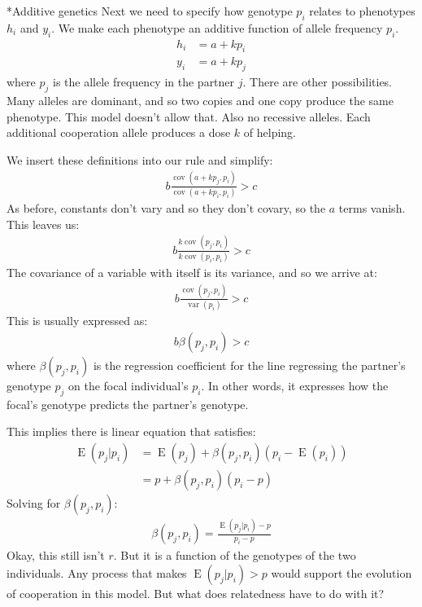 \documentclass[10pt,reqno]{amsbook}
\makeatletter
\DeclareMathOperator{\var}{var}
\DeclareMathOperator{\cov}{cov}
\DeclareMathOperator{\E}{E}
\renewcommand\subsection{\@startsection{subsection}{2}
\z@{.5\linespacing\@plus.7\linespacing}{-.5em}%
{\normalfont\normalsize\bfseries}}
\numberwithin{equation}{chapter}
\makeatother
\begin{document}
\subsection*{Additive genetics}
Next we need to specify how genotype $p_i$ relates to phenotypes $h_i$ and $y_i$. We make each phenotype an additive function of allele frequency $p_i$.
\begin{align*}
	h_i &= a + kp_i\\
	y_i &= a + kp_j
\end{align*}
where $p_j$ is the allele frequency in the partner $j$. There are other possibilities. Many alleles are dominant, and so two copies and one copy produce the same phenotype. This model doesn't allow that. Also no recessive alleles. Each additional cooperation allele produces a dose $k$ of helping. 

We insert these definitions into our rule and simplify:
\begin{align*}
	b \frac{ \cov( a + kp_j , p_i ) }{\cov( a + kp_i  , p_i )}  > c
\end{align*}
As before, constants don't vary and so they don't covary, so the $a$ terms vanish. This leaves us:
\begin{align*}
	b \frac{ k \cov( p_j , p_i ) }{k \cov( p_i  , p_i )}  > c
\end{align*}
The covariance of a variable with itself is its variance, and so we arrive at:
\begin{align*}
	b \frac{ \cov( p_j , p_i ) }{\var( p_i )}  > c
\end{align*}
This is usually expressed as:
\begin{align*}
	b { \beta( p_j , p_i ) }  > c
\end{align*}
where $\beta(p_j,p_i)$ is the regression coefficient for the line regressing the partner's genotype $p_j$ on the focal individual's $p_i$. In other words, it expresses how the focal's genotype predicts the partner's genotype.

This implies there is linear equation that satisfies:
\begin{align*}
	\E(p_j|p_i) &= \E(p_j) + \beta(p_j,p_i)(p_i-\E(p_i)) \\
	&= p + \beta(p_j,p_i)(p_i-p)
\end{align*}
Solving for $\beta(p_j,p_i)$:
\begin{align*}
	\beta(p_j,p_i) = \frac{\E(p_j|p_i)-p}{p_i-p}
\end{align*}
Okay, this still isn't $r$. But it is a function of the genotypes of the two individuals. Any process that makes $\E(p_j|p_i) > p$ would support the evolution of cooperation in this model. But what does relatedness have to do with it?
\end{document}
